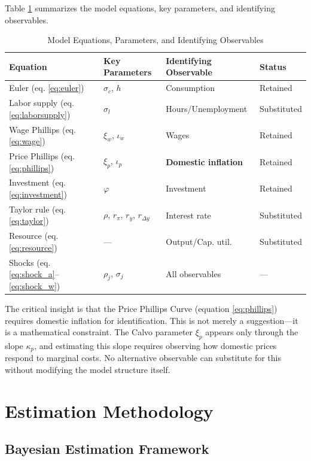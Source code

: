 \documentclass[12pt]{article}
\begin{document}
Table \ref{tab:equations} summarizes the model equations, key parameters, and identifying observables.

\begin{table}[H]
\centering
\caption{Model Equations, Parameters, and Identifying Observables}
\label{tab:equations}
\small
\begin{tabular}{llll}
\toprule
Equation & Key Parameters & Identifying Observable & Status \\
\midrule
Euler (eq. \ref{eq:euler}) & $\sigma_c$, $h$ & Consumption & Retained \\
Labor supply (eq. \ref{eq:laborsupply}) & $\sigma_l$ & Hours/Unemployment & Substituted \\
Wage Phillips (eq. \ref{eq:wage}) & $\xi_w$, $\iota_w$ & Wages & Retained \\
Price Phillips (eq. \ref{eq:phillips}) & $\xi_p$, $\iota_p$ & \textbf{Domestic inflation} & Retained \\
Investment (eq. \ref{eq:investment}) & $\varphi$ & Investment & Retained \\
Taylor rule (eq. \ref{eq:taylor}) & $\rho$, $r_\pi$, $r_y$, $r_{\Delta y}$ & Interest rate & Substituted \\
Resource (eq. \ref{eq:resource}) & --- & Output/Cap. util. & Substituted \\
Shocks (eq. \ref{eq:shock_a}--\ref{eq:shock_w}) & $\rho_j$, $\sigma_j$ & All observables & --- \\
\bottomrule
\end{tabular}
\end{table}

The critical insight is that the Price Phillips Curve (equation \ref{eq:phillips}) requires domestic inflation for identification. This is not merely a suggestion---it is a mathematical constraint. The Calvo parameter $\xi_p$ appears only through the slope $\kappa_p$, and estimating this slope requires observing how domestic prices respond to marginal costs. No alternative observable can substitute for this without modifying the model structure itself.


\section{Estimation Methodology}

\subsection{Bayesian Estimation Framework}
\end{document}
